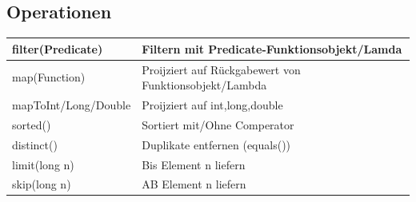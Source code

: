 \subsection{Operationen}
\begin{tabular}{p{4cm}p{5cm}}
	filter(Predicate) & Filtern mit Predicate-Funktionsobjekt/Lamda \\ \midrule
	map(Function) & Proijziert auf Rückgabewert von Funktionsobjekt/Lambda \\ \midrule
	mapToInt/Long/Double & Proijziert auf int,long,double \\ \midrule
	sorted() & Sortiert mit/Ohne Comperator \\ \midrule
	distinct() & Duplikate entfernen (equals()) \\ \midrule
	limit(long n) & Bis Element n liefern \\ \midrule
	skip(long n) & AB Element n liefern 
\end{tabular}